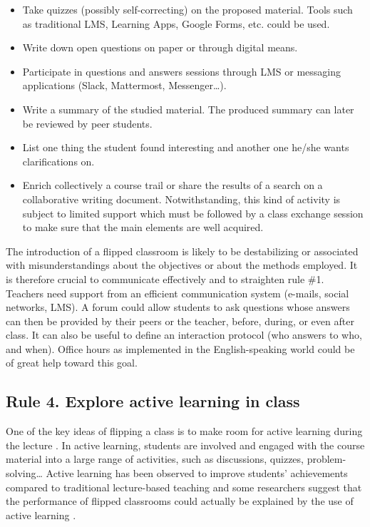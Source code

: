 \documentclass[10pt,letterpaper]{article}
\begin{document}
\begin{itemize}

\item Take quizzes (possibly self-correcting) on the proposed material. 
Tools such as traditional LMS, Learning Apps, Google Forms, etc. could be used.

\item Write down open questions on paper or through digital means.

\item Participate in questions and answers sessions through LMS 
or messaging applications (Slack, Mattermost, Messenger\ldots).

\item Write a summary of the studied material. 
The produced summary can later be reviewed by peer students.

\item List one thing the student found interesting and another one he/she
wants clarifications on.

\item Enrich collectively a course trail or share the results of a search on a collaborative writing document. 
Notwithstanding, this kind of activity is subject to limited support which must be followed 
by a class exchange session to make sure that the main elements are well acquired.

\end{itemize}

The introduction of a flipped classroom is likely to be destabilizing or associated with misunderstandings 
about the objectives or about the methods employed. It is therefore crucial to communicate effectively 
\cite{lo_critical_2017} and to straighten rule \#1. 
Teachers need support from an efficient communication system (e-mails, social networks, LMS). 
A forum could allow students to ask questions whose answers can then be provided by their peers 
or the teacher, before, during, or even after class. It can also be useful to define an interaction protocol 
(who answers to who, and when). 
Office hours as implemented in the English-speaking world could be of great help toward this goal.


\subsection{Rule 4. Explore active learning in class}

One of the key ideas of flipping a class is to make room for active learning during the lecture \cite{delozier_flipped_2017}.
In active learning, students are involved and engaged with the course material into a large range of activities, 
such as discussions, quizzes, problem-solving\ldots{} 
Active learning has been observed to improve students' achievements compared to traditional lecture-based teaching \cite{freeman_reply_2014} and some researchers suggest that the performance of flipped classrooms 
could actually be explained by the use of active learning \cite{jensen_improvements_2015}.
\end{document}
